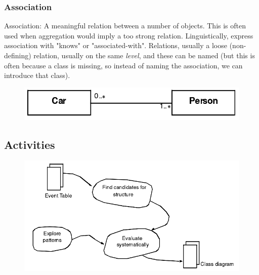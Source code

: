 \subsubsection{Association}
Association: A meaningful relation between a number of objects. This is often used when aggregation would imply a too strong relation. Linguistically, express association with "knows" or "associated-with".
Relations, usually a loose (non-defining) relation, usually on the same \textit{level}, and these can be named (but this is often because a class is missing, so instead of naming the association, we can introduce that class). 
\begin{figure}[H]
    \centering
    \includegraphics[scale=1.5]{figures/association.png}
\end{figure}

\subsection{Activities}
\begin{figure}[H]
    \centering
    \includegraphics[scale=1.5]{figures/structureactivity.png}
\end{figure}

